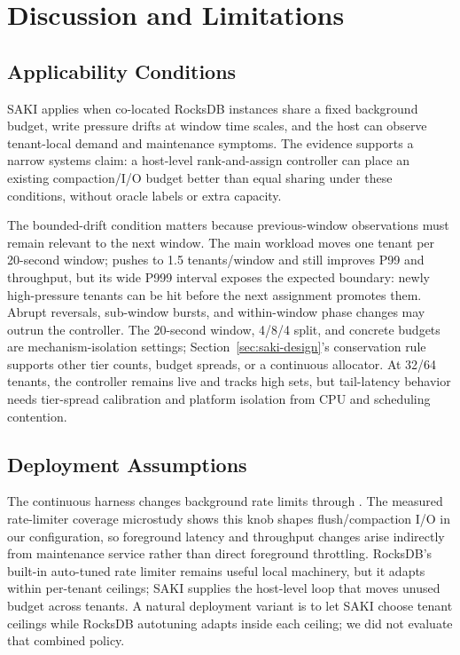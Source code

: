 \section{Discussion and Limitations}

\subsection{Applicability Conditions}
\label{sec:discussion-drift}

SAKI applies when co-located RocksDB instances share a fixed background budget,
write pressure drifts at window time scales, and the host can observe
tenant-local demand and maintenance symptoms. The evidence supports a narrow
systems claim: a host-level rank-and-assign controller can place an existing
compaction/I/O budget better than equal sharing under these conditions, without
oracle labels or extra capacity.

The bounded-drift condition matters because previous-window observations must
remain relevant to the next window. The main workload moves one tenant per
20-second window; \fastdrift pushes to 1.5 tenants/window and still improves
P99 and throughput, but its wide P999 interval exposes the expected boundary:
newly high-pressure tenants can be hit before the next assignment promotes
them. Abrupt reversals, sub-window bursts, and within-window phase changes may
outrun the controller. The 20-second window, 4/8/4 split, and concrete budgets
are mechanism-isolation settings; Section~\ref{sec:saki-design}'s conservation
rule supports other tier counts, budget spreads, or a continuous allocator. At
32/64 tenants, the controller remains live and tracks high sets, but
tail-latency behavior needs tier-spread calibration and platform isolation from
CPU and scheduling contention.

\subsection{Deployment Assumptions}

The continuous harness changes background rate limits through \ratecall. The
measured rate-limiter coverage microstudy shows this knob shapes
flush/compaction I/O in our configuration, so foreground latency and
throughput changes arise indirectly from maintenance service rather than
direct foreground throttling. RocksDB's built-in auto-tuned rate limiter
remains useful local machinery, but it adapts within per-tenant ceilings;
SAKI supplies the host-level loop that moves unused budget across tenants. A
natural deployment variant is to let SAKI choose tenant ceilings while RocksDB
autotuning adapts inside each ceiling; we did not evaluate that combined
policy.

